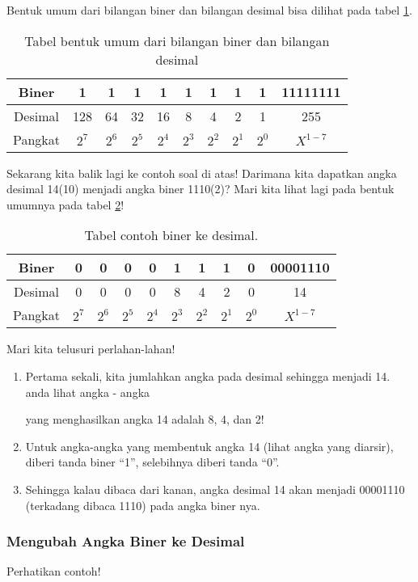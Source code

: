 \documentclass{article}
\begin{document}
Bentuk umum dari bilangan biner dan bilangan desimal bisa dilihat pada tabel \ref{table:binerdesimal}. 

\begin{table}[h!]
\centering
\begin{tabular}{ |c|c|c|c|c|c|c|c|c|c| } 
\hline
Biner & 1 & 1 & 1 & 1 & 1 & 1 & 1 & 1 & 11111111 \\ 
\hline
Desimal & 128 & 64 & 32 & 16 & 8 & 4 & 2 & 1 & 255 \\ 
\hline
Pangkat & $2^7$ & $2^6$ & $2^5$ & $2^4$ & $2^3$ & $2^2$ & $2^1$ & $2^0$ & $X^{1-7}$ \\ 
\hline
\end{tabular}
\caption{Tabel bentuk umum dari bilangan biner dan bilangan desimal}
\label{table:binerdesimal}
\end{table}
Sekarang kita balik lagi ke contoh soal di atas! Darimana kita dapatkan angka desimal 14(10) menjadi angka biner 1110(2)? 
Mari kita lihat lagi pada bentuk umumnya pada tabel \ref{table:contoh1}!

\begin{table}[h!]
\centering
\begin{tabular}{ |c|c|c|c|c|c|c|c|c|c| } 
\hline
Biner & 0 & 0 & 0 & 0 & 1 & 1 & 1 & 0 & 00001110 \\ 
\hline
Desimal & 0 & 0 & 0 & 0 & 8 & 4 & 2 & 0 & 14 \\ 
\hline
Pangkat & $2^7$ & $2^6$ & $2^5$ & $2^4$ & $2^3$ & $2^2$ & $2^1$ & $2^0$ & $X^{1-7}$ \\ 
\hline
\end{tabular}
\caption{Tabel contoh biner ke desimal.}
\label{table:contoh1}
\end{table}

Mari kita telusuri perlahan-lahan!

\begin{enumerate}
\item Pertama sekali, kita jumlahkan angka pada desimal sehingga menjadi 14. anda lihat angka - angka 


yang menghasilkan angka 14 adalah 8, 4, dan 2!
\item Untuk angka-angka yang membentuk angka 14 (lihat angka yang diarsir), diberi tanda biner “1”, selebihnya diberi tanda “0”.
\item Sehingga kalau dibaca dari kanan, angka desimal 14 akan menjadi 00001110 (terkadang dibaca 1110) pada angka biner nya.
\end{enumerate}


\subsubsection{Mengubah Angka Biner ke Desimal}
Perhatikan contoh! 
\end{document}
